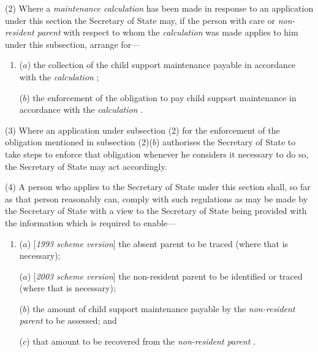 \documentclass[12pt,a4paper]{article}
\begin{document}
(2) Where a 
\emph{maintenance calculation}  %
has been made in response to an application under this section the Secretary of State may, if the person with care or 
\emph{non-resident parent}  %
with respect to whom the 
\emph{calculation}  %
was made applies to him under this subsection, arrange for—
\begin{enumerate}\item[]
($a$) the collection of the child support maintenance payable in accordance with the 
\emph{calculation}%
;

($b$) the enforcement of the obligation to pay child support maintenance in accordance with the 
\emph{calculation}%
.
\end{enumerate}

(3) Where an application under subsection (2)  for the enforcement of the obligation mentioned in subsection (2)($b$)  authorises the Secretary of State to take steps to enforce that obligation whenever he considers it necessary to do so, the Secretary of State may act accordingly.

(4) A person who applies to the Secretary of State under this section shall, so far as that person reasonably can, comply with such regulations as may be made by the Secretary of State with a view to the Secretary of State 
being provided with the information which is required to enable—
\begin{enumerate}\item[]
($a$) [\emph{1993 scheme version}] the absent parent to be traced (where that is necessary);

($a$) [\emph{2003 scheme version}] the 
non-resident parent  %
to be 
identified or  %
traced (where that is necessary);

($b$) the amount of child support maintenance payable by the 
\emph{non-resident parent}  %
to be assessed; and

($c$) that amount to be recovered from the 
\emph{non-resident parent}%
.
\end{enumerate}
\end{document}
